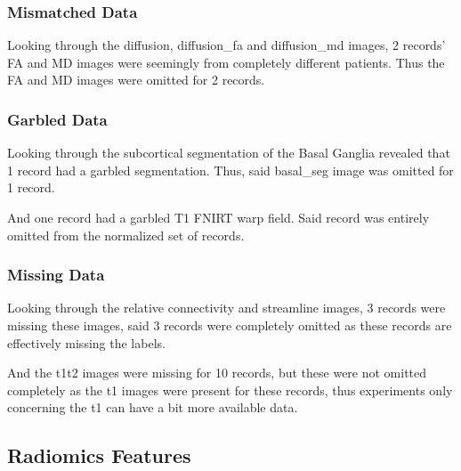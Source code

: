 \subsubsection{Mismatched Data}

Looking through the diffusion, diffusion\_fa and diffusion\_md images, 2 records' \ac{FA} and \ac{MD} images were seemingly from completely different patients. Thus the \ac{FA} and \ac{MD} images were omitted for 2 records.

\subsubsection{Garbled Data}

Looking through the subcortical segmentation of the Basal Ganglia revealed that 1 record had a garbled segmentation. Thus, said basal\_seg image was omitted for 1 record.\par
And one record had a garbled T1 \ac{FNIRT} warp field. Said record was entirely omitted from the normalized set of records.

\subsubsection{Missing Data}

Looking through the relative connectivity and streamline images, 3 records were missing these images, said 3 records were completely omitted as these records are effectively missing the labels.\par
And the t1t2 images were missing for 10 records, but these were not omitted completely as the t1 images were present for these records, thus experiments only concerning the t1 can have a bit more available data.

\subsection{Radiomics Features}

